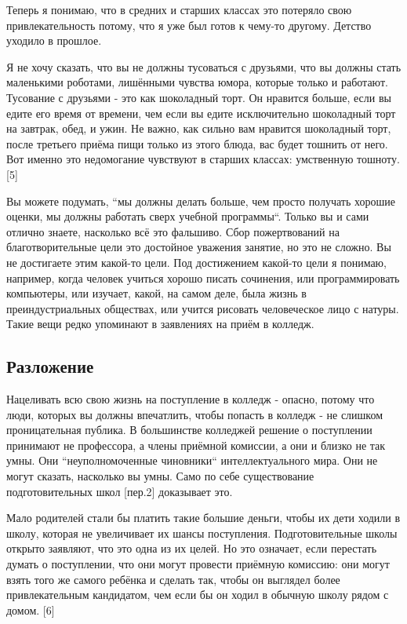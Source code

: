 \documentclass[ebook,12pt,oneside,openany]{memoir}
\begin{document}
Теперь я понимаю, что в средних и старших классах это потеряло свою
привлекательность потому, что я уже был готов к чему-то другому.
Детство уходило в прошлое. \newline

Я не хочу сказать, что вы не должны тусоваться с друзьями, что вы
должны стать маленькими роботами, лишёнными чувства юмора, которые
только и работают. Тусование с друзьями - это как шоколадный торт. Он
нравится больше, если вы едите его время от времени, чем если вы едите
исключительно шоколадный торт на завтрак, обед, и ужин. Не важно, как
сильно вам нравится шоколадный торт, после третьего приёма пищи только
из этого блюда, вас будет тошнить от него. Вот именно это недомогание
чувствуют в старших классах: умственную тошноту.[5] \newline

Вы можете подумать, ``мы должны делать больше, чем просто получать
хорошие оценки, мы должны работать сверх учебной программы``. Только вы
и сами отлично знаете, насколько всё это фальшиво. Сбор пожертвований
на благотворительные цели это достойное уважения занятие, но это не
сложно. Вы не достигаете этим какой-то цели. Под достижением какой-то
цели я понимаю, например, когда человек учиться хорошо писать
сочинения, или программировать компьютеры, или изучает, какой, на
самом деле, была жизнь в преиндустриальных обществах, или учится
рисовать человеческое лицо с натуры. Такие вещи редко упоминают в
заявлениях на приём в колледж. \newline

\subsection{Разложение}

Нацеливать всю свою жизнь на поступление в колледж - опасно, потому
что люди, которых вы должны впечатлить, чтобы попасть в колледж - не
слишком проницательная публика. В большинстве колледжей решение о
поступлении принимают не профессора, а члены приёмной комиссии, а они
и близко не так умны. Они ``неуполномоченные чиновники``
интеллектуального мира. Они не могут сказать, насколько вы умны. Само
по себе существование подготовительных школ [пер.2] доказывает это. \newline

Мало родителей стали бы платить такие большие деньги, чтобы их дети
ходили в школу, которая не увеличивает их шансы поступления.
Подготовительные школы открыто заявляют, что это одна из их целей. Но
это означает, если перестать думать о поступлении, что они могут
провести приёмную комиссию: они могут взять того же самого ребёнка и
сделать так, чтобы он выглядел более привлекательным кандидатом, чем
если бы он ходил в обычную школу рядом с домом. [6] \newline
\end{document}

